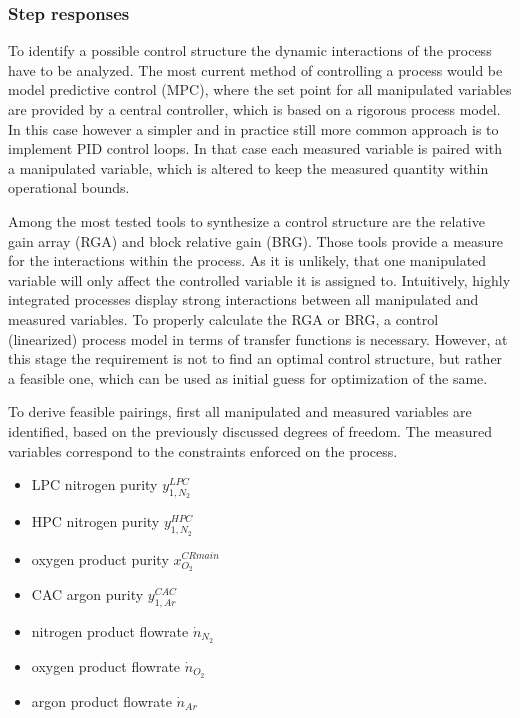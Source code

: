         \subsubsection{Step responses}
            To identify a possible control structure the dynamic interactions of the process have to be analyzed.
            The most current method of controlling a process would be model predictive control (MPC), where
            the set point for all manipulated variables are provided by a central controller, which is based
            on a rigorous process model. In this case however a simpler and in practice still more common
            approach is to implement PID control loops. In that case each measured variable is paired
            with a manipulated variable, which is altered to keep the measured quantity within operational
            bounds.

            Among the most tested tools to synthesize a control structure are the relative gain array (RGA) and block
            relative gain (BRG). Those tools provide a measure for the interactions within the process. As it
            is unlikely, that one manipulated variable will only affect the controlled variable it is assigned to.
            Intuitively, highly integrated processes display strong interactions between all manipulated and
            measured variables. To properly calculate the RGA or BRG, a control (linearized) process model
            in terms of transfer functions is necessary. However, at this stage the requirement is not to find an
            optimal control structure, but rather a feasible one, which can be used as initial guess for
            optimization of the same.

            To derive feasible pairings, first all manipulated and measured variables are identified, based on the
            previously discussed degrees of freedom. The measured variables correspond to the constraints enforced
            on the process.
            \begin{itemize}
                \item LPC nitrogen purity $y_{1,N_2}^{LPC}$
                \item HPC nitrogen purity $y_{1,N_2}^{HPC}$
                \item oxygen product purity $x_{O_2}^{CR main}$
                \item CAC argon purity $y_{1,Ar}^{CAC}$
                \item nitrogen product flowrate $\dot{n}_{N_2}$
                \item oxygen product flowrate $\dot{n}_{O_2}$
                \item argon product flowrate $\dot{n}_{Ar}$
            \end{itemize}


